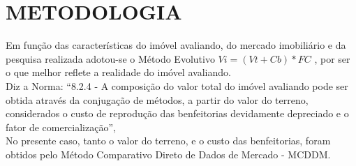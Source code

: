 \section{METODOLOGIA}
%
\hspace*{1.25 cm} Em função das características do imóvel avaliando, do mercado imobiliário e da pesquisa realizada adotou-se o Método Evolutivo \(Vi = (Vt + Cb) * FC \) , por ser o que melhor reflete a realidade do imóvel avaliando.\\ 
%
\hspace*{1.25 cm} Diz a Norma: “8.2.4 - A composição do valor total do imóvel avaliando pode ser obtida através da conjugação de métodos, a partir do valor do terreno, considerados o custo de reprodução das benfeitorias devidamente depreciado e o fator de comercialização”,\\ 
%
\hspace*{1.25 cm} No presente caso, tanto o valor do terreno, e o custo das benfeitorias, foram obtidos pelo Método Comparativo Direto de Dados de Mercado - MCDDM.
